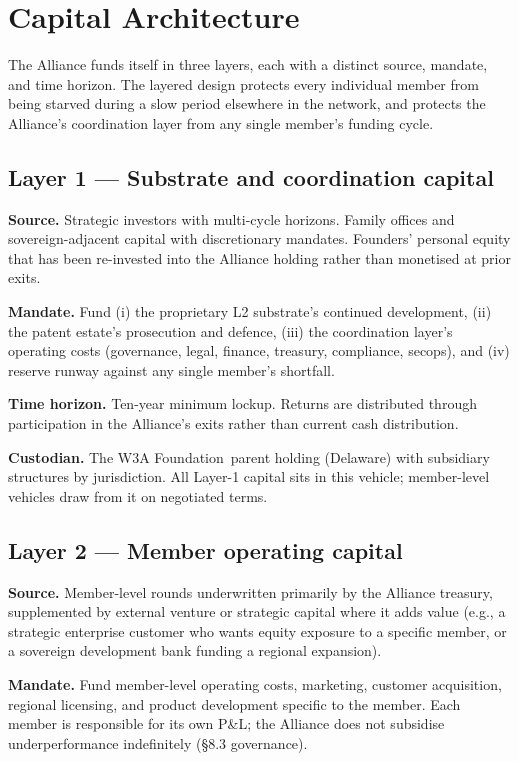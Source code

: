 \section{Capital Architecture}

The Alliance funds itself in three layers, each with a distinct source,
mandate, and time horizon. The layered design protects every individual
member from being starved during a slow period elsewhere in the network,
and protects the Alliance's coordination layer from any single member's
funding cycle.

\subsection{Layer 1 --- Substrate and coordination capital}

\textbf{Source.} Strategic investors with multi-cycle horizons. Family
offices and sovereign-adjacent capital with discretionary mandates.
Founders' personal equity that has been re-invested into the Alliance
holding rather than monetised at prior exits.

\textbf{Mandate.} Fund (i) the proprietary L2 substrate's continued
development, (ii) the patent estate's prosecution and defence, (iii) the
coordination layer's operating costs (governance, legal, finance, treasury,
compliance, secops), and (iv) reserve runway against any single member's
shortfall.

\textbf{Time horizon.} Ten-year minimum lockup. Returns are distributed
through participation in the Alliance's exits rather than current cash
distribution.

\textbf{Custodian.} The W3A Foundation\ parent holding (Delaware)
with subsidiary structures by jurisdiction. All Layer-1 capital sits in
this vehicle; member-level vehicles draw from it on negotiated terms.

\subsection{Layer 2 --- Member operating capital}

\textbf{Source.} Member-level rounds underwritten primarily by the
Alliance treasury, supplemented by external venture or strategic capital
where it adds value (e.g., a strategic enterprise customer who wants
equity exposure to a specific member, or a sovereign development bank
funding a regional expansion).

\textbf{Mandate.} Fund member-level operating costs, marketing, customer
acquisition, regional licensing, and product development specific to the
member. Each member is responsible for its own P\&L; the Alliance does
not subsidise underperformance indefinitely (\S 8.3 governance).

